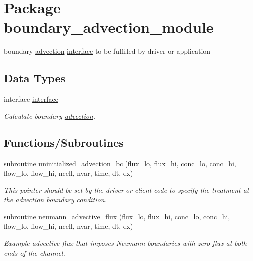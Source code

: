 \hypertarget{a00053}{
\section{Package boundary\_\-advection\_\-module}
\label{a00053}
}
boundary \hyperlink{a00052}{advection} \hyperlink{a00004}{interface} to be fulfilled by driver or application  


\subsection*{Data Types}
\begin{CompactItemize}
\item 
interface \hyperlink{a00004}{interface}
\begin{CompactList}\small\item\em Calculate boundary \hyperlink{a00052}{advection}. \item\end{CompactList}\end{CompactItemize}
\subsection*{Functions/Subroutines}
\begin{CompactItemize}
\item 
subroutine \hyperlink{a00053_26eb82e9a6eae1dd87145fafd01bd2ae}{uninitialized\_\-advection\_\-bc} (flux\_\-lo, flux\_\-hi, conc\_\-lo, conc\_\-hi, flow\_\-lo, flow\_\-hi, ncell, nvar, time, dt, dx)
\begin{CompactList}\small\item\em This pointer should be set by the driver or client code to specify the treatment at the \hyperlink{a00052}{advection} boundary condition. \item\end{CompactList}\item 
subroutine \hyperlink{a00053_be28f15b0eabbed1d1f745d2e27cbdc7}{neumann\_\-advective\_\-flux} (flux\_\-lo, flux\_\-hi, conc\_\-lo, conc\_\-hi, flow\_\-lo, flow\_\-hi, ncell, nvar, time, dt, dx)
\begin{CompactList}\small\item\em Example advective flux that imposes Neumann boundaries with zero flux at both ends of the channel. \item\end{CompactList}\end{CompactItemize}



